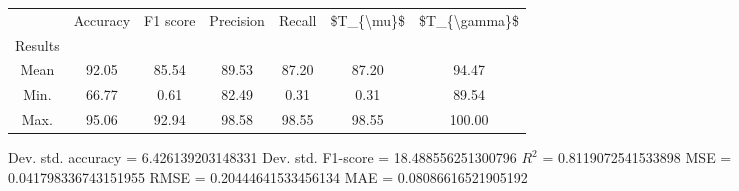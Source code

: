 \begin{tabular}{|c|c|c|c|c|c|c|}
\toprule
{} &  Accuracy &  F1 score &  Precision &  Recall &  \$T\_\{\textbackslash mu\}\$ &  \$T\_\{\textbackslash gamma\}\$ \\
Results &           &           &            &         &            &               \\
\hline
Mean    &     92.05 &     85.54 &      89.53 &   87.20 &      87.20 &         94.47 \\
Min.    &     66.77 &      0.61 &      82.49 &    0.31 &       0.31 &         89.54 \\
Max.    &     95.06 &     92.94 &      98.58 &   98.55 &      98.55 &        100.00 \\
\bottomrule
\end{tabular}

 Dev. std. accuracy = 6.426139203148331
 Dev. std. F1-score = 18.488556251300796
 $R^2$ = 0.8119072541533898
 MSE = 0.041798336743151955
 RMSE = 0.20444641533456134
 MAE = 0.08086616521905192
